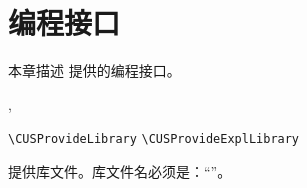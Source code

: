 \documentclass[twoside]{book}
\begin{document}





\chapter{编程接口}

本章描述 \CusTeX 提供的编程接口。

\begin{function}[module=cus]{\CUSProvideLibrary,\CUSProvideExplLibrary}
\begin{syntax}
  \verb|\CUSProvideLibrary|      
  \verb|\CUSProvideExplLibrary|    
\end{syntax}
提供库文件。库文件名必须是：“”。
\end{function}
\end{document}
